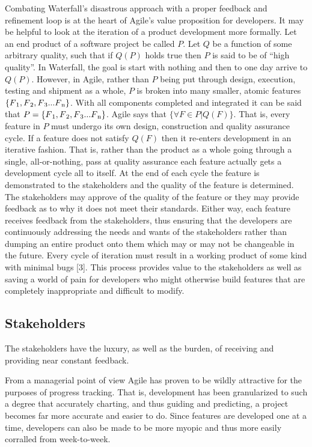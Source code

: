 \documentclass{report}
\begin{document}
Combating Waterfall’s disastrous approach with a proper feedback and refinement loop is at the heart of Agile’s value proposition for developers. It may be helpful to look at the iteration of a product development more formally. Let an end product of a software project be called $P$. Let $Q$ be a function of some arbitrary quality, such that if $Q(P)$ holds true then $P$ is said to be of “high quality”. In Waterfall, the goal is start with nothing and then to one day arrive to $Q(P)$. However, in Agile, rather than $P$ being put through design, execution, testing and shipment as a whole, $P$ is broken into many smaller, atomic features $\{F\textsubscript{1}, F\textsubscript{2}, F\textsubscript{3} ... F\textsubscript{n}\}$. With all components completed and integrated it can be said that $P = \{F\textsubscript{1}, F\textsubscript{2}, F\textsubscript{3} ... F\textsubscript{n}\}$. Agile says that $\{\forall F \in P | Q(F)\}$. That is, every feature in $P$ must undergo its own design, construction and quality assurance cycle. If a feature does not satisfy $Q(F)$ then it re-enters development in an iterative fashion. That is, rather than the product as a whole going through a single, all-or-nothing, pass at quality assurance each feature actually gets a development cycle all to itself. At the end of each cycle the feature is demonstrated to the stakeholders and the quality of the feature is determined. The stakeholders may approve of the quality of the feature or they may provide feedback as to why it does not meet their standards. Either way, each feature receives feedback from the stakeholders, thus ensuring that the developers are continuously addressing the needs and wants of the stakeholders rather than dumping an entire product onto them which may or may not be changeable in the future. Every cycle of iteration must result in a working product of some kind with minimal bugs [3]. This process provides value to the stakeholders as well as saving a world of pain for developers who might otherwise build features that are completely inappropriate and difficult to modify.

\subsection{Stakeholders}
The stakeholders have the luxury, as well as the burden, of receiving and providing near constant feedback.

  From a managerial point of view Agile has proven to be wildly attractive for the purposes of progress tracking. That is, development has been granularized to such a degree that accurately charting, and thus guiding and predicting, a project becomes far more accurate and easier to do. Since features are developed one at a time, developers can also be made to be more myopic and thus more easily corralled from week-to-week.
\end{document}
